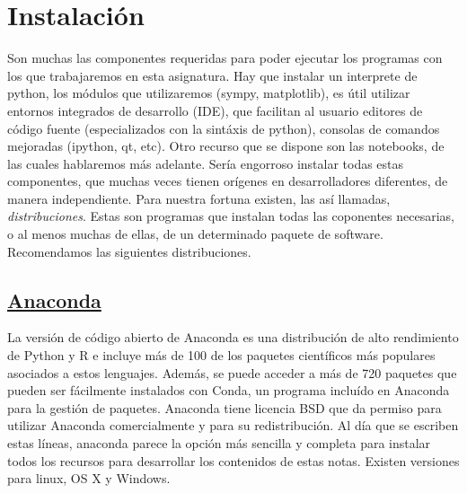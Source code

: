 \section{Instalación}


Son muchas las componentes requeridas para poder ejecutar los programas con los que trabajaremos 
en esta asignatura. Hay que instalar un interprete de python, los módulos que utilizaremos 
(sympy, matplotlib), es útil utilizar entornos integrados de desarrollo (IDE), que facilitan al usuario
editores de código fuente (especializados con la sintáxis de python), consolas de comandos
mejoradas (ipython, qt, etc). Otro recurso que se dispone son las notebooks, de las cuales 
hablaremos más adelante. Sería engorroso instalar todas estas componentes, que muchas veces 
tienen orígenes en desarrolladores diferentes, de manera independiente. Para nuestra fortuna
existen, las así llamadas, \emph{distribuciones}. Estas son programas que instalan todas 
las coponentes necesarias, o al menos muchas  de ellas, de un determinado paquete de software.
Recomendamos las siguientes distribuciones.  

\subsection{\href{https://www.continuum.io/downloads}{Anaconda}} 
La versión de código abierto de Anaconda es una distribución de alto rendimiento de Python y R 
e incluye más de 100 de los paquetes científicos más populares asociados a estos lenguajes.
Además, se puede acceder a más de 720 paquetes que pueden ser fácilmente instalados con Conda, 
 un programa incluído en Anaconda para la gestión de paquetes.
 Anaconda tiene licencia BSD que da permiso para utilizar Anaconda comercialmente 
 y para su redistribución. Al día que se escriben estas líneas, anaconda parece la opción más 
 sencilla y completa para instalar todos los recursos para desarrollar los contenidos de 
 estas notas. Existen versiones para linux, OS X y Windows. 



